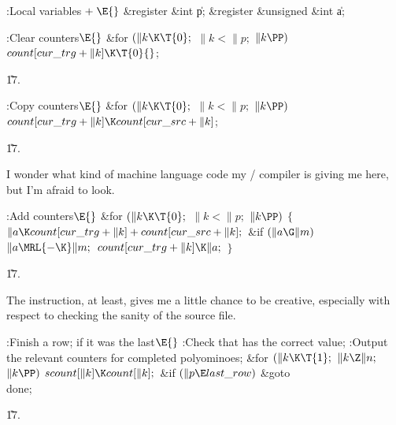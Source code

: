 \B{}:Local variables\X${}\mathrel+\E{}$\6
\&{register} \&{int} \|p;\6
\&{register} \&{unsigned} \&{int} \|a;\par
\fi

\B{}:Clear  counters\X${}\E{}$\6
\&{for} ${}(\|k\K\T{0};{}$ ${}\|k<\|p;{}$ ${}\|k\PP){}$\1\5
${}\\{count}[\\{cur\_trg}+\|k]\K\T{0}{}$;\2\par
\U17.\fi

\B{}:Copy  counters\X${}\E{}$\6
\&{for} ${}(\|k\K\T{0};{}$ ${}\|k<\|p;{}$ ${}\|k\PP){}$\1\5
${}\\{count}[\\{cur\_trg}+\|k]\K\\{count}[\\{cur\_src}+\|k]{}$;\2\par
\U17.\fi

I wonder what kind of machine language code my \CEE/ compiler
is giving me here, but I'm afraid to look.

\Y\B\4:Add  counters\X${}\E{}$\6
\&{for} ${}(\|k\K\T{0};{}$ ${}\|k<\|p;{}$ ${}\|k\PP){}$\5
${}\{{}$\1\6
${}\|a\K\\{count}[\\{cur\_trg}+\|k]+\\{count}[\\{cur\_src}+\|k];{}$\6
\&{if} ${}(\|a\G\|m){}$\1\5
${}\|a\MRL{-{\K}}\|m;{}$\2\6
${}\\{count}[\\{cur\_trg}+\|k]\K\|a;{}$\6
\4${}\}{}$\2\par
\U17.\fi

The  instruction, at least, gives me a little chance to be
creative,
especially with respect to checking the sanity of the source file.

\Y\B\4:Finish a row;  if it was the last\X${}\E{}$\6
:Check that  has the correct value\X;\6
:Output the relevant counters for completed polyominoes\X;\6
\&{for} ${}(\|k\K\T{1};{}$ ${}\|k\Z\|n;{}$ ${}\|k\PP){}$\1\5
${}\\{scount}[\|k]\K\\{count}[\|k];{}$\2\6
\&{if} ${}(\|p\E\\{last\_row}){}$\1\5
\&{goto} \\{done};\2\par
\U17.\fi

